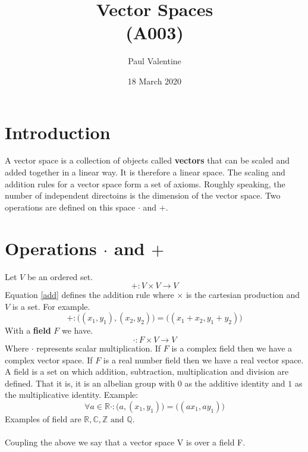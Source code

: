 \documentclass[a4paper]{article}
\title{\textbf{Vector Spaces}\\(A003)}
\author{Paul Valentine}
\date{18 March 2020}
\begin{document}
\maketitle
\section{Introduction}
A vector space is a collection of objects called \textbf{vectors} that can be scaled and added together in a linear way. It is therefore a linear space. The scaling and addition rules for a vector space form a set of axioms. Roughly speaking, the number of independent directoins is the dimension of the vector space. Two operations are defined on this space $\cdot$ and $+$.
\section{Operations $\cdot$ and $+$}
Let $V$ be an ordered set.
\label{operations}
\begin{equation}
  \label{add}
  +:V \times V \to V
\end{equation}
Equation \ref{add} defines the addition rule where $\times$ is the cartesian production\cite{A002} and $V$ is a set. For example.
\begin{equation}
  +:\big((x_1, y_1),(x_2,y_2)\big) = \big((x_1+x_2,y_1+y_2)\big)
\end{equation}
 With a \textbf{field}\cite{wiki:mathfield} $F$ we have.
\begin{equation}
  \cdot : F \times V \to V
\end{equation}
Where $\cdot$ represents scalar multiplication. If $F$ is a complex field then we have a complex vector space. If $F$ is a real number field then we have a real vector space. A field is a set on which addition, subtraction, multiplication and division are defined. That it is, it is an albelian group with $0$ as the additive identity and $1$ as the multiplicative identity. Example:
\begin{equation}
\forall a\in \mathbb{R}  \cdot:\big(a,(x_1,y_1)\big) = \big((ax_1,ay_1)\big)
\end{equation}
Examples of field are $\mathbb{R}, \mathbb{C}, \mathbb{Z} \text{ and } \mathbb{Q}$.\\ \\
Coupling the above we say that a vector space V is over a field F.
\end{document}

